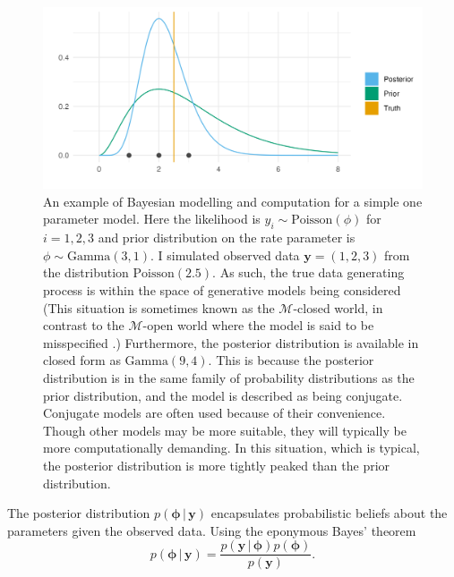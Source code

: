 \documentclass[a4paper, nobind]{templates/ociamthesis}
\begin{document}
\begin{figure}

{\centering \includegraphics[width=0.95\linewidth]{figures/bayesian/conjugate} 

}

\caption{An example of Bayesian modelling and computation for a simple one parameter model. Here the likelihood is \(y_i \sim \text{Poisson}(\phi)\) for \(i = 1, 2, 3\) and prior distribution on the rate parameter is \(\phi \sim \text{Gamma}(3, 1)\). I simulated observed data \(\mathbf{y} = (1, 2, 3)\) from the distribution \(\text{Poisson}(2.5)\). As such, the true data generating process is within the space of generative models being considered (This situation is sometimes known \autocite{bernardo2001bayesian} as the \(\mathcal{M}\)-closed world, in contrast to the \(\mathcal{M}\)-open world where the model is said to be misspecified .) Furthermore, the posterior distribution is available in closed form as \(\text{Gamma}(9, 4)\). This is because the posterior distribution is in the same family of probability distributions as the prior distribution, and the model is described as being conjugate. Conjugate models are often used because of their convenience. Though other models may be more suitable, they will typically be more computationally demanding. In this situation, which is typical, the posterior distribution is more tightly peaked than the prior distribution.}\label{fig:conjugate}
\end{figure}

The posterior distribution \(p(\boldsymbol{\mathbf{\phi}} \, | \, \mathbf{y})\) encapsulates probabilistic beliefs about the parameters given the observed data.
Using the eponymous Bayes' theorem
\begin{equation}
p(\boldsymbol{\mathbf{\phi}} \, | \, \mathbf{y}) = \frac{p(\mathbf{y} \, | \, \boldsymbol{\mathbf{\phi}}) p(\boldsymbol{\mathbf{\phi}})}{p(\mathbf{y})}. \label{eq:posterior}
\end{equation}
\end{document}
